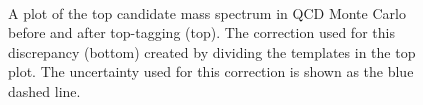 \begin{figure}[Htcb]
\centering
{}\\
\caption{A plot of the top candidate mass spectrum in QCD Monte Carlo before and after top-tagging (top).  The correction used for this 
discrepancy (bottom) created by dividing the templates in the top plot.  The uncertainty used for this correction is shown as the blue dashed line.}
\label{figs:bsmodmass}
\end{figure}

